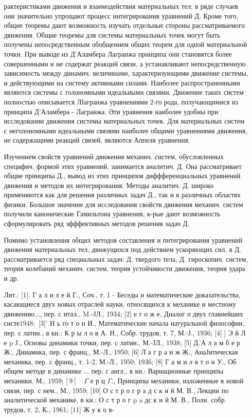 \documentclass[10pt]{article}
\begin{document}
рактеристиками движения и взаимодействия материальных тел; в ряде случаев они значительно упрощают процесс интегрирования уравнений Д. Кроме того, общие теоремы дают возможность изучать отдельные стороны рассматриваемого движения. Общие теоремы для системы материальных точек могут быть получены непосредственным обобщением общих теорем для одной материальной точки. При выводе из Д'Аламбера Лагранжа принципа они становятся более совершенными и не содержат реакций связи, а устанавливают непосредственную зависимость между динамич. величинами, характеризующими движение системы, и действующими на систему активными силами. Наиболее распространенными являются системы с голономными идеальными связями. Движение таких систем полностью описывается ЛІагранжа уравнениями 2-го рода, получающимися из принципа Д'Аламбера - Лагранжа. Әти уравнения наиболее удобны при исследовании движения системы материальных точек. Для материальных систем с неголономными идеальными связями наиболее общими уравнениями движения, не содержащими реакций связей, являются Аппеля уравнения.



Изучением свойств уравнений движения механич. систем, обусловленных специфич. формой этих уравнений, занимается аналитич. Д. Она рассматривает общие принципы Д., вывод из этих принципов диффференциальных уравнений движения и методов их интегрирования. Методы аналитич. Д. широко применяются как для решения различных задач Д., так и в различных областях физики. Большое значение для исследования свойств движения механич. систем получили канонические Гамильтона уравнения, к-рые дают возможность сформулировать ряд эфффективных методов решения задач Д.



Помимо установления общих методов составления и пнтегрирования уравнений движения материальных тел, движущихся под действием ускоряющих сил, в Д. рассматривается ряд специальных задач: Д. твердого тела, Д. гироскопич. систем, теория колебаний механич. систем, теория устойчивости движения, теория удара и др.



Лит.: [1]. Г а л и л е й Г., Соч., т. 1 - Беседы и математические доказательства, касающиеся двух новых отраслей науки, относящихся к механике и местному движению..., пер. с итал., M.-ЈЛ., 1934; [2] е г о ж е, Диалог о двух главнейших систе$1948 ;$ [3]' Н ь го т о н И., Математические начала натуральной философии, пер. с латин., в кн.: К р ы л о в А. Н., Собр. трудов, т. 7, М.-Ј., 1936; [4] ] Э й Л е p Ј., Основы динамики точки, пер. с латин., М.-ЈЛ., 1938; [5] Д.'А л а м б е р Ж., Динамика, пер. с франц., М.-Л., 1950; [6] Л а г р а н ж Ж., АнаЈитическая механика, пер. с франц., т. 1-2, М.-Л., 1950; 1936; [8] Г а м и л в т о н У., Об общем методе в динамике ... пер. с англ., в кн.: Вариационные принципы механики, М., $1959 ;[9] \quad \Gamma$ е р ц $\Gamma$., Принципы механики, изложенные в новой связи, пер. с нем., М., 1959; [10] О с т р о г р а д с к и й М. В., Лекции по аналитической механике, в кн.: О с т р о г p a дс к и й М. В., Полн. собр. трудов, т. 2, К., 1961; [11] Ж у к о в-
\end{document}
